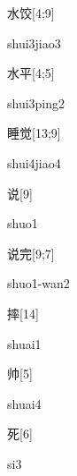 \begin{verbete}{水饺}[4;9]
\begin{pronuncia}{shui3jiao3}
\end{pronuncia}
\end{verbete}

\begin{verbete}{水平}[4;5]
\begin{pronuncia}{shui3ping2}
\end{pronuncia}
\end{verbete}

\begin{verbete}{睡觉}[13;9]
\begin{pronuncia}{shui4jiao4}
\end{pronuncia}
\end{verbete}

\begin{verbete}[shuo1]{说}[9]
\begin{pronuncia}{shuo1}
\end{pronuncia}
\end{verbete}

\begin{verbete}{说完}[9;7]
\begin{pronuncia}{shuo1-wan2}
\end{pronuncia}
\end{verbete}

\begin{verbete}[shuai1]{摔}[14]
\begin{pronuncia}{shuai1}
\end{pronuncia}
\end{verbete}

\begin{verbete}[shuai4]{帅}[5]
\begin{pronuncia}{shuai4}
\end{pronuncia}
\end{verbete}

\begin{verbete}[si3]{死}[6]
\begin{pronuncia}{si3}
\end{pronuncia}
\end{verbete}

